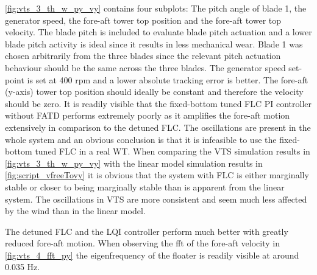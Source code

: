 \cref{fig:vts_3_th_w_py_vy} contains four subplots: The pitch angle of blade 1, the generator speed, the fore-aft tower top position and the fore-aft tower top velocity. The blade pitch is included to evaluate blade pitch actuation and a lower blade pitch activity is ideal since it results in less mechanical wear. Blade 1 was chosen arbitrarily from the three blades since the relevant pitch actuation behaviour should be the same across the three blades. The generator speed set-point is set at 400 rpm and a lower absolute tracking error is better. The fore-aft (y-axis) tower top position should ideally be constant and therefore the velocity should be zero. It is readily visible that the fixed-bottom tuned FLC PI controller without FATD performs extremely poorly as it amplifies the fore-aft motion extensively in comparison to the detuned FLC. The oscillations are present in the whole system and an obvious conclusion is that it is infeasible to use the fixed-bottom tuned FLC in a real WT. When comparing the VTS simulation results in \cref{fig:vts_3_th_w_py_vy} with the linear model simulation results in \cref{fig:script_vfreeTovy} it is obvious that the system with FLC is either marginally stable or closer to being marginally stable than is apparent from the linear system. The oscillations in VTS are more consistent and seem much less affected by the wind than in the linear model.

The detuned FLC and the LQI controller perform much better with greatly reduced fore-aft motion. When observing the fft of the fore-aft velocity in \cref{fig:vts_4_fft_py} the eigenfrequency of the floater is readily visible at around 0.035 Hz.

